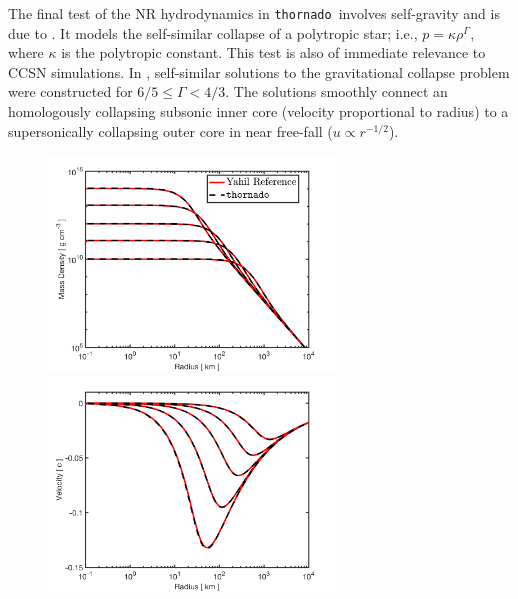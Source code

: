 \documentclass[letterpaper]{jpconf}
\newcommand{\thornado}{\texttt{thornado}}
\begin{document}
The final test of the NR hydrodynamics in \thornado\ involves self-gravity and is due to \cite{yahilLattimer_1982,yahil_1983}.  
It models the self-similar collapse of a polytropic star; i.e., $p=\kappa\rho^{\Gamma}$, where $\kappa$ is the polytropic constant.  
This test is also of immediate relevance to CCSN simulations.  
In \cite{yahilLattimer_1982,yahil_1983}, self-similar solutions to the gravitational collapse problem were constructed for $6/5\le\Gamma<4/3$.   
The solutions smoothly connect an homologously collapsing subsonic inner core (velocity proportional to radius) to a supersonically collapsing outer core in near free-fall ($u\propto r^{-1/2}$).  
\begin{figure}[h]
  \centering
  \begin{minipage}{18pc}
    \includegraphics[width=18pc]{./Figures/YahilLattimerCollapse_MassDensity_Astronum_2018}
  \end{minipage}\hspace{0.5pc}%
  \begin{minipage}{18pc}
    \includegraphics[width=18pc]{./Figures/YahilLattimerCollapse_Velocity_Astronum_2018}

\end{minipage}
\end{figure}
\end{document}
